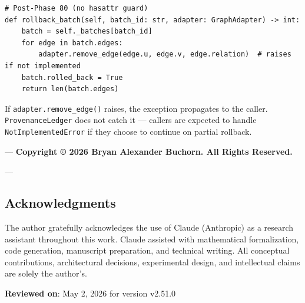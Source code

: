 \begin{lstlisting}
# Post-Phase 80 (no hasattr guard)
def rollback_batch(self, batch_id: str, adapter: GraphAdapter) -> int:
    batch = self._batches[batch_id]
    for edge in batch.edges:
        adapter.remove_edge(edge.u, edge.v, edge.relation)  # raises if not implemented
    batch.rolled_back = True
    return len(batch.edges)
\end{lstlisting}

If \texttt{adapter.remove\_edge()} raises, the exception propagates to the caller. \texttt{ProvenanceLedger} does not catch it — callers are expected to handle \texttt{NotImplementedError} if they choose to continue on partial rollback.

---
\textbf{Copyright © 2026 Bryan Alexander Buchorn. All Rights Reserved.}

---
\subsection{Acknow\-ledgments}

The author gratefully ackno\-wledges the use of Claude (Anthropic) as a research assistant throughout this work. Claude assisted with mathe\-matical forma\-lization, code generation, manuscript preparation, and technical writing. All conceptual contr\-ibutions, archi\-tectural decisions, exper\-imental design, and intel\-lectual claims are solely the author's.

\textbf{Reviewed on}: May 2, 2026 for version v2.51.0
